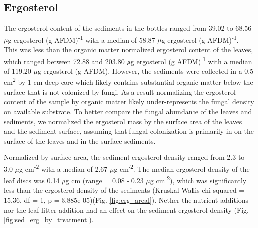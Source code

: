 \subsection{Ergosterol}

The ergosterol content of the sediments in the bottles ranged from 39.02 to 68.56 $\mu$g ergosterol (g AFDM)\textsuperscript{-1} with a median of 58.87 $\mu$g ergosterol (g AFDM)\textsuperscript{-1}. This was less than the organic matter normalized ergosterol content of the leaves, which ranged between 72.88 and 203.80 $\mu$g ergosterol (g AFDM)\textsuperscript{-1} with a median of 119.20 $\mu$g ergosterol (g AFDM). However, the sediments were collected in a 0.5 cm\textsuperscript{2} by 1 cm deep core which likely contains substantial organic matter below the surface that is not colonized by fungi. As a result normalizing the ergosterol content of the sample by organic matter likely under-represents the fungal density on available substrate.  To better compare the fungal abundance of the leaves and sediments, we normalized the ergosterol mass by the surface area of the leaves and the sediment surface, assuming that fungal colonization is primarily in on the surface of the leaves and in the surface sediments.

Normalized by surface area, the sediment ergosterol density ranged from 2.3 to 3.0 $\mu$g cm\textsuperscript{-2} with a median of 2.67 $\mu$g cm\textsuperscript{-2}. The median ergosterol density of the leaf discs was 0.14 $\mu$g cm (range = 0.08 - 0.23 $\mu$g cm\textsuperscript{-2}), which was significantly less than the ergosterol density of the sediments (Kruskal-Wallis chi-squared = 15.36, df = 1, p = 8.885e-05)(Fig. \ref{fig:erg_areal}). Nether the nutrient additions nor the leaf litter addition had an effect on the sediment ergosterol density (Fig. \ref{fig:sed_erg_by_treatment}).
